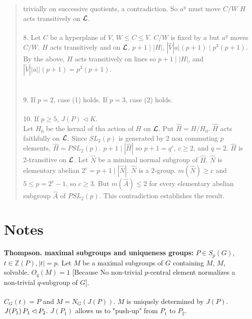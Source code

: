 \begin{quote}
trivially on successive quotients, a contradiction.  So $a^g$ must move $C/W$ 
$H$ acts transitively on ${\cal L}$.
\\
\\
8. Let $C$ be a hyperplane of $V$, $W \leq C \leq V$. $C/W$ is fixed by $a$ but $a^g$ moves $C/W$.  $H$ acts transitively and
on ${\cal L}$, $p+1 \mid |H|$, $|{\hat V} |a| (p+1) \mid p^3 (p+1)$.\\
By the above, $H$ acts transitively on lines so $p+1 \mid |H|$, and
$|{\tilde V}| |a| |(p+1) = p^3 (p+1)$.\\
\\
\\
9. If $p=2$, case (1) holds.  If $p=3$, case (2) holds.
\\
\\
10. If $p\geq 5$, $J(P) \lhd K$.\\
Let $H_0$ be the kernal of tha action of $H$ on ${\cal L}$. Put ${\hat H} = H/H_0$. ${\hat H}$ acts faithfully on ${\cal L}$.
Since $SL_2(p)$ is generated by 2 non commuting $p$ elements, ${\hat H} = PSL_2(p)$.   $p+1 \mid |{\hat H}|$ so $p+1=q^c$, $c \geq 2$,
and $q=2$.
${\hat H}$ is 2-transitive on ${\cal L}$.  Let ${\hat N}$ be a minimal normal subgroup of ${\hat H}$.  ${\hat N}$ is elementary
abelian $2^c=p+1 \mid |{\hat N}|$. ${\hat N}$ is a 2-group. $m({\hat N}) \geq c$ and
$5 \leq p= 2^c-1$, so $c \geq 3$.  But $m({\hat A}) \leq 2$ for every elementary abelian subgroup ${\hat A}$ of $PSL_2(p)$.  This contradiction
establishes the result.
\end{quote}
\section{Notes}
{\bf Thompson. maximal subgroups and uniqueness groups:}
$P \in S_p(G)$, $t \in {\mathbb Z}(P), |t|=p$.  Let $M$ be a maximal subgroups of $G$ containing $M$, $M$, solvable.
$O_q(M)= 1$ [Because No non-trivial $p$-central element normalizes a non-trivial $q$-subgroup of $G$].
\\
\\
$C_G(t)=P$ and $M = N_G(J(P))$.  $M$ is uniquely determined by $J(P)$. $J(P_1) \thinspace P_1 \lhd P_2$.
$J(P_1)$ allows us to "push-up" from $P_1$ to $P_2$.
